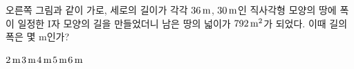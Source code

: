 \noindent\begin{minipage}[t]{0.58\linewidth}\vspace{0pt}\raggedright 오른쪽 그림과 같이 가로, 세로의 길이가 각각 $36\mkern3mu \mathrm{m}$, $30\mkern3mu \mathrm{m}$인 직사각형 모양의 땅에 폭이 일정한 I자 모양의 길을 만들었더니 남은 땅의 넓이가 $792\mkern3mu \mathrm{m}^2$가 되었다. 이때 길의 폭은 몇 $\mathrm{m}$인가?\end{minipage}\hfill\begin{minipage}[t]{0.4\linewidth}\vspace{0pt}\centering \resizebox{\ifdim\width>\linewidth\linewidth\else\width\fi}{!}{}\end{minipage}\par
\begin{choices32}{$2\mkern3mu \mathrm{m}$}{$3\mkern3mu \mathrm{m}$}{$4\mkern3mu \mathrm{m}$}{$5\mkern3mu \mathrm{m}$}{$6\mkern3mu \mathrm{m}$}\end{choices32}
